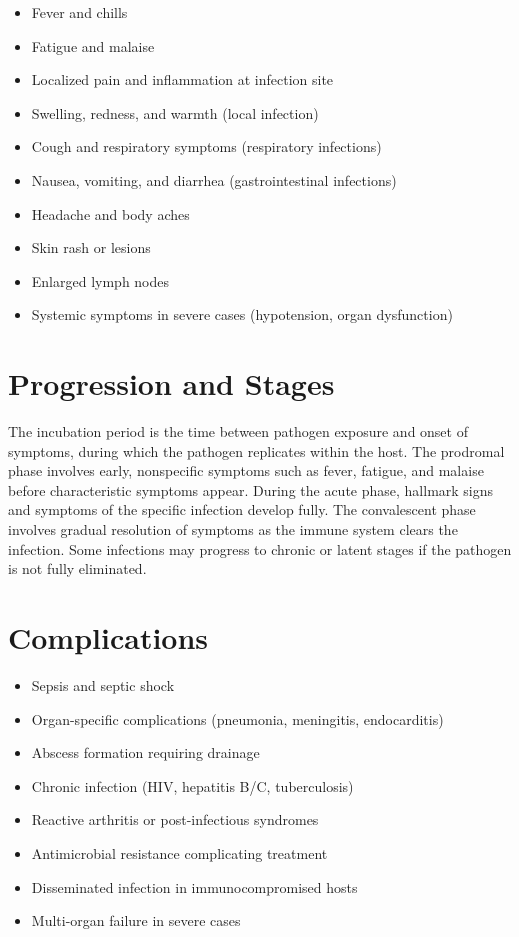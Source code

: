 \begin{itemize}[noitemsep]
  \item Fever and chills
  \item Fatigue and malaise
  \item Localized pain and inflammation at infection site
  \item Swelling, redness, and warmth (local infection)
  \item Cough and respiratory symptoms (respiratory infections)
  \item Nausea, vomiting, and diarrhea (gastrointestinal infections)
  \item Headache and body aches
  \item Skin rash or lesions
  \item Enlarged lymph nodes
  \item Systemic symptoms in severe cases (hypotension, organ dysfunction)
\end{itemize}
\section{Progression and Stages}
The incubation period is the time between pathogen exposure and onset of symptoms, during which the pathogen replicates within the host. The prodromal phase involves early, nonspecific symptoms such as fever, fatigue, and malaise before characteristic symptoms appear. During the acute phase, hallmark signs and symptoms of the specific infection develop fully. The convalescent phase involves gradual resolution of symptoms as the immune system clears the infection. Some infections may progress to chronic or latent stages if the pathogen is not fully eliminated.
\section{Complications}
\begin{itemize}[noitemsep]
  \item Sepsis and septic shock
  \item Organ-specific complications (pneumonia, meningitis, endocarditis)
  \item Abscess formation requiring drainage
  \item Chronic infection (HIV, hepatitis B/C, tuberculosis)
  \item Reactive arthritis or post-infectious syndromes
  \item Antimicrobial resistance complicating treatment
  \item Disseminated infection in immunocompromised hosts
  \item Multi-organ failure in severe cases
\end{itemize}
